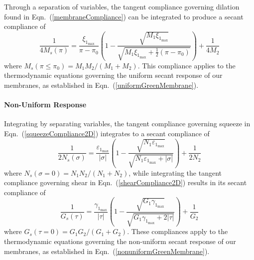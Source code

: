 Through a separation of variables, the tangent compliance governing dilation found in Eqn.~(\ref{membraneCompliance}) can be integrated to produce a secant compliance of
\begin{equation}
    \frac{1}{4M_s (\pi)} = \frac{\xi_{1_{\max}}}{\pi - \pi_0} \left( 
    1 - \frac{\sqrt{M_1 \xi_{1_{\max}}}}
    {\sqrt{M_1 \xi_{1_{\max}} + \tfrac{1}{2} ( \pi - \pi_0 )}} \right) + 
    \frac{1}{4M_2}
\end{equation}
where $M_s (\pi \! \leq \! \pi_0) = M_1 M_2 / ( M_1 + M_2 )$.  This compliance applies to the thermo\-dynamic equations governing the uniform secant response of our membranes, as established in Eqn.~(\ref{uniformGreenMembrane}).

\paragraph{Non-Uniform Response}

Integrating by separating variables, the tangent compliance governing squeeze in Eqn.~(\ref{squeezeCompliance2D}) integrates to a secant compliance of
\begin{equation}
\frac{1}{2N_s (\sigma)} = 
\frac{\varepsilon_{1_{\max}}}{|\sigma|} \left(
1 - \frac{\sqrt{N_1 \varepsilon_{1_{\max}}}}
{\sqrt{N_1 \varepsilon_{1_{\max}} + | \sigma |}} \right) + 
\frac{1}{2N_2}
\end{equation}
where $N_s (\sigma \! = \! 0) = N_1 N_2 / (N_1 + N_2)$, while
integrating the tangent compliance governing shear in Eqn.~(\ref{shearCompliance2D}) results in its secant compliance of
\begin{equation}
    \frac{1}{G_s (\tau)} = 
    \frac{\gamma_{1_{\max}}}{|\tau|} \left(
    1 - \frac{\sqrt{G_1 \gamma_{1_{\max}}}}
    {\sqrt{G_1 \gamma_{1_{\max}} + 2 | \tau |}} \right) + 
    \frac{1}{G_2}
\end{equation}
where $G_s (\tau \! = \! 0) = G_1 G_2 / (G_1 + G_2)$.  These compliances apply to the thermo\-dynamic equations governing the non-uniform secant response of our membranes, as established in Eqn.~(\ref{nonuniformGreenMembrane}).